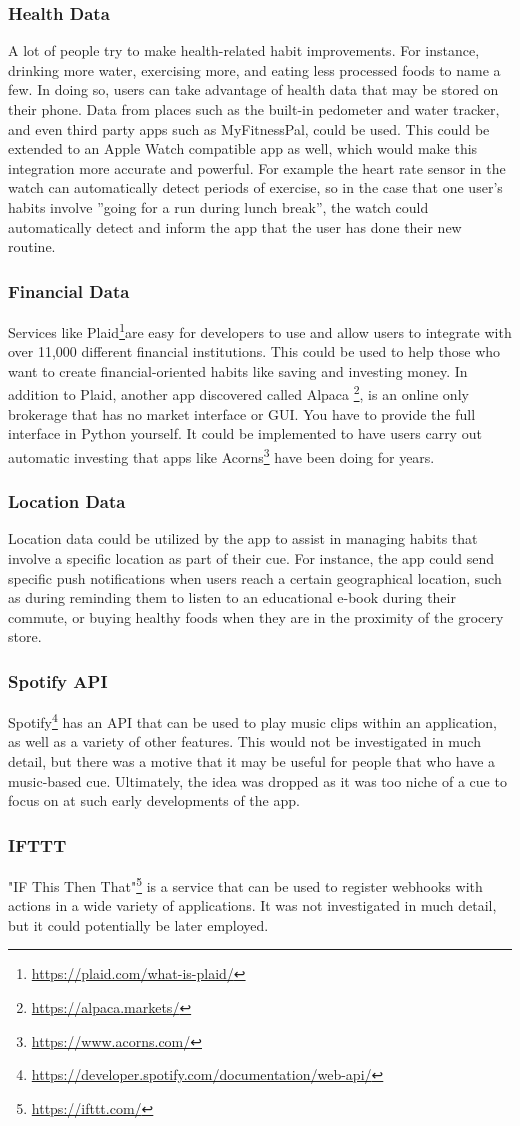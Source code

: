 \subsubsection{Health Data}
A lot of people try to make health-related habit improvements. For instance, drinking more water, exercising more, and eating less processed foods to name a few. In doing so, users can take advantage of health data that may be stored on their phone. Data from places such as the built-in pedometer and water tracker, and even third party apps such as MyFitnessPal, could be used. This could be extended to an Apple Watch compatible app as well, which would make this integration more accurate and powerful. For example the heart rate sensor in the watch can automatically detect periods of exercise, so in the case that one user’s habits involve ”going for a run during lunch break”, the watch could automatically detect and inform the app that the user has done their new routine.
\subsubsection{Financial Data}
Services like Plaid\footnote{\url{https://plaid.com/what-is-plaid/}}are easy for developers to use and allow users to integrate with over 11,000 different financial institutions. This could be used to help those who want to create financial-oriented habits like saving and investing money. In addition to Plaid, another app discovered called Alpaca \footnote{\url{https://alpaca.markets/}}, is an online only brokerage that has no market interface or GUI. You have to provide the full interface in Python yourself. It could be implemented to have users carry out automatic investing that apps like Acorns\footnote{\url{https://www.acorns.com/}} have been doing for years.
\subsubsection{Location Data}
Location data could be utilized by the app to assist in managing habits that involve a specific location as part of their cue. For instance, the app could send specific push notifications when users reach a certain geographical location, such as during reminding them to listen to an educational e-book during their commute, or buying healthy foods when they are in the proximity of the grocery store.

\subsubsection{Spotify API}
Spotify\footnote{\url{https://developer.spotify.com/documentation/web-api/}} has an API that can be used to play music clips within an application, as well as a variety of other features. This would not be investigated in much detail, but there was a motive that it may be useful for people that who have a music-based cue. Ultimately, the idea was dropped as it was too niche of a cue to focus on at such early developments of the app.
\subsubsection{IFTTT}
"IF This Then That"\footnote{\url{https://ifttt.com/}} is a service that can be used to register webhooks with actions in a wide variety of applications. It was not investigated in much detail, but it could potentially be later employed.